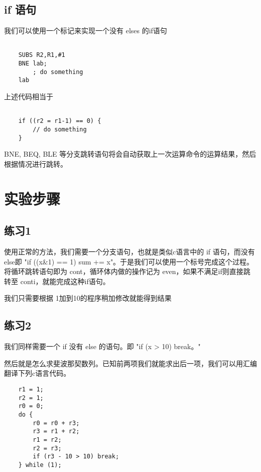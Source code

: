 \documentclass[a4paper,10pt,UTF8]{paper}
\numberwithin{equation}{section}
\numberwithin{figure}{section}
\begin{document}
\subsection{if 语句}

我们可以使用一个标记来实现一个没有 elses 的if语句

\begin{verbatim}

    SUBS R2,R1,#1
    BNE lab;
        ; do something
    lab

\end{verbatim}

上述代码相当于 

\begin{verbatim}

    if ((r2 = r1-1) == 0) {
        // do something
    }

\end{verbatim}

BNE, BEQ, BLE 等分支跳转语句将会自动获取上一次运算命令的运算结果，然后根据情况进行跳转。

\section{实验步骤}

\subsection{练习1}

使用正常的方法，我们需要一个分支语句，也就是类似c语言中的 if 语句，而没有else即 "if ((x\&1) == 1) sum += x"。于是我们可以使用一个标号完成这个过程。将循环跳转语句即为 cont，循环体内做的操作记为 even，如果不满足if则直接跳转至 conti，就能完成这种if语句。

我们只需要根据 1加到10的程序稍加修改就能得到结果

\subsection{练习2}

我们同样需要一个 if 没有 else 的语句。即 "if (x > 10) break。"

然后就是怎么求斐波那契数列。已知前两项我们就能求出后一项，我们可以用汇编翻译下列c语言代码。

\begin{verbatim}
    r1 = 1;
    r2 = 1;
    r0 = 0;
    do {
        r0 = r0 + r3;
        r3 = r1 + r2;
        r1 = r2;
        r2 = r3;
        if (r3 - 10 > 10) break;
    } while (1);

\end{verbatim}
\end{document}

